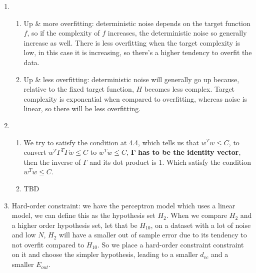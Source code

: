 \documentclass{article}
\begin{document}
    \begin{enumerate}
        \item \begin{enumerate}[label=(\alph*)]
            \item Up \& more overfitting: deterministic noise depends on the target function $f$, so if the complexity of $f$ increases, the deterministic noise so generally increase as well. There is less overfitting when the target complexity is low, in this case it is increasing, so there's a higher tendency to overfit the data.
            \item Up \& less overfitting: deterministic noise will generally go up because, relative to the fixed target function, $H$ becomes less complex. Target complexity is exponential when compared to overfitting, whereas noise is linear, so there will be less overfitting.
        \end{enumerate}

        \item \begin{enumerate}[label=(\alph*)]
            \item We try to satisfy the condition at 4.4, which tells us that $w^Tw \leq C$, to convert $w^T \Gamma^T \Gamma w \leq C$ to $w^Tw \leq C$, $\mathbf{\Gamma}$ \textbf{has to be the identity vector}, then the inverse of $\Gamma$ and its dot product is 1. Which satisfy the condition $w^Tw \leq C$.
            \item TBD
        \end{enumerate}

        \item Hard-order constraint: we have the perceptron model which uses a linear model, we can define this as the hypothesis set $H_2$. When we compare $H_2$ and a higher order hypothesis set, let that be $H_{10}$, on a dataset with a lot of noise and low $N$, $H_2$ will have a smaller out of sample error due to its tendency to not overfit compared to $H_{10}$. So we place a hard-order constraint constraint on it and choose the simpler hypothesis, leading to a smaller $d_{vc}$ and a smaller $E_{out}$.
    \end{enumerate}
\end{document}

